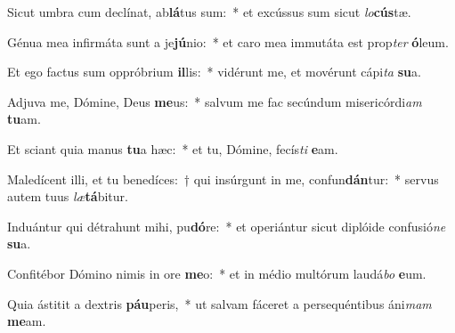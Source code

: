 \item Sicut umbra cum declínat, ab\textbf{lá}tus sum:~* et excússus sum sicut \textit{lo}\textbf{cús}tæ.
\item Génua mea infirmáta sunt a je\textbf{jú}nio:~* et caro mea immutáta est prop\textit{ter} \textbf{ó}leum.
\item Et ego factus sum oppróbrium \textbf{il}lis:~* vidérunt me, et movérunt cápi\textit{ta} \textbf{su}a.
\item Adjuva me, Dómine, Deus \textbf{me}us:~* salvum me fac secúndum misericórdi\textit{am} \textbf{tu}am.
\item Et sciant quia manus \textbf{tu}a hæc:~* et tu, Dómine, fecís\textit{ti} \textbf{e}am.
\item Maledícent illi, et tu benedíces:~† qui insúrgunt in me, confun\textbf{dán}tur:~* servus autem tuus \textit{læ}\textbf{tá}bitur.
\item Induántur qui détrahunt mihi, pu\textbf{dó}re:~* et operiántur sicut diplóide confusió\textit{ne} \textbf{su}a.
\item Confitébor Dómino nimis in ore \textbf{me}o:~* et in médio multórum laudá\textit{bo} \textbf{e}um.
\item Quia ástitit a dextris \textbf{páu}peris,~* ut salvam fáceret a persequéntibus áni\textit{mam} \textbf{me}am.
